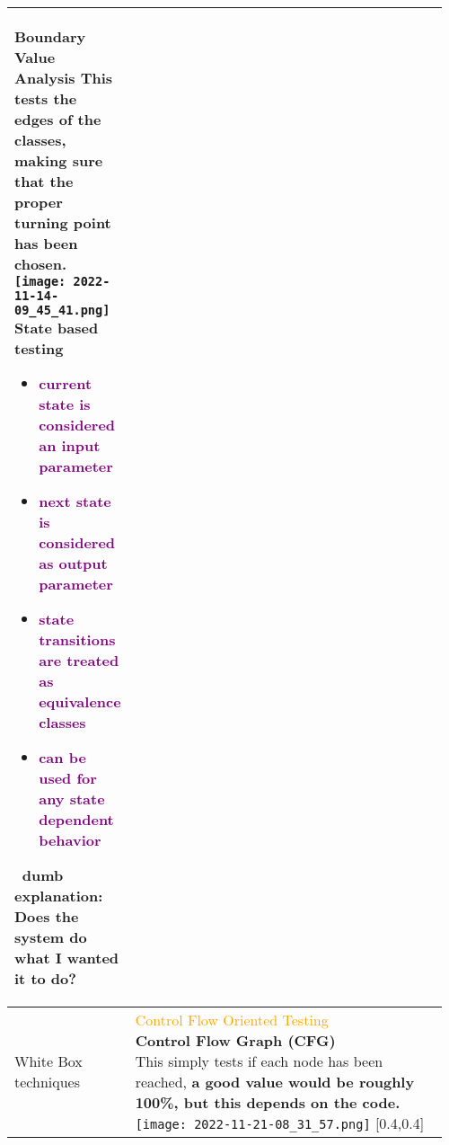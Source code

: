 \documentclass[main.tex,fontsize=8pt,paper=a4,paper=portrait,DIV=calc,]{scrartcl}
\begin{document}
\begin{table}[ht!]
\begin{tabular}{|m{0.2\linewidth}|m{0.755\linewidth}|}
\textcolor{OliveGreen}{Boundary Value Analysis}\newline
This tests the edges of the classes, making sure that the proper turning point has been chosen.\newline
\texttt{[image: 2022-11-14-09\_45\_41.png]}\newline
\textcolor{OliveGreen}{State based testing}\newline
\begin{itemize}
\item \textcolor{purple}{current state is considered an input parameter}
\item \textcolor{purple}{next state is considered as output parameter}
\item \textcolor{purple}{state transitions are treated as equivalence classes}
\item \textcolor{purple}{can be used for any state dependent behavior}
\vspace{-3mm}
\end{itemize} 
\, \newline
dumb explanation: Does the system do what I wanted it to do?\\
\hline
White Box techniques & 
\minipg{
\textcolor{orange}{Control Flow Oriented Testing}\newline
\textbf{Control Flow Graph (CFG)}\newline
This simply tests if each node has been reached, \textbf{a good value would be roughly 100\%, but this depends on the code. }
}{
\texttt{[image: 2022-11-21-08\_31\_57.png]} 
}[0.4,0.4]\\
\hline
\end{tabular}
\end{table}
\pagebreak
\end{document}
